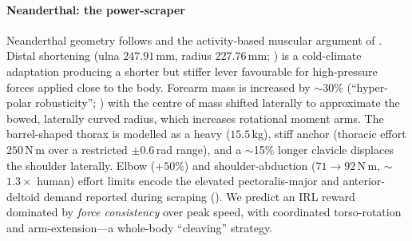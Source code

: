 \paragraph{Neanderthal: the power-scraper}
  Neanderthal geometry follows \citet{degroote2011} and the activity-based
  muscular argument of \citet{shaw2012}. Distal shortening (ulna $247.91$\,mm,
  radius $227.76$\,mm; \citealp[Table~4]{degroote2011}) is a cold-climate
  adaptation producing a shorter but stiffer lever favourable for high-pressure
  forces applied close to the body. Forearm mass is increased by $\sim$30\%
  (``hyper-polar robusticity''; \citealp[p.~397]{degroote2011}) with the
  centre of mass shifted laterally to approximate the bowed, laterally curved
  radius, which increases rotational moment arms. The barrel-shaped thorax is
  modelled as a heavy ($15.5$\,kg), stiff anchor (thoracic effort $250$\,N\,m
  over a restricted $\pm0.6$\,rad range), and a $\sim$15\% longer clavicle
  displaces the shoulder laterally. Elbow ($+50\%$) and shoulder-abduction
  ($71{\to}92$\,N\,m, $\sim$$1.3\times$ human) effort limits encode the elevated pectoralis-major and
  anterior-deltoid demand reported during scraping
  (\citealp[Tables~1--2]{shaw2012}). We predict an IRL reward dominated by
  \emph{force consistency} over peak speed, with coordinated torso-rotation and
  arm-extension---a whole-body ``cleaving'' strategy.

